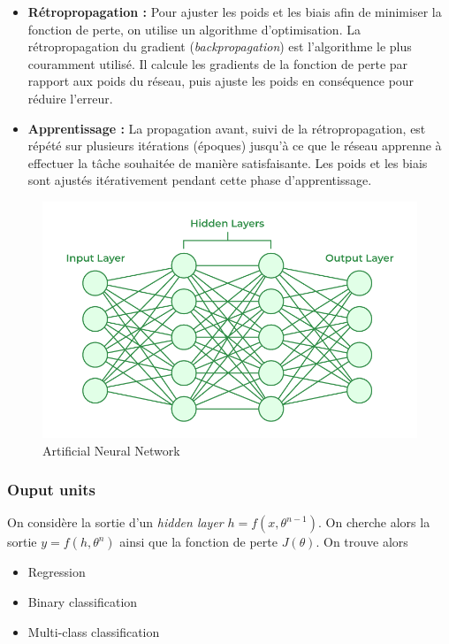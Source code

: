 \documentclass[a4paper]{article}
\begin{document}
\begin{itemize}
    \item \textbf{Rétropropagation :} Pour ajuster les poids et les biais afin de minimiser la fonction de perte, on utilise un algorithme d'optimisation. La rétropropagation du gradient (\textit{backpropagation}) est l'algorithme le plus couramment utilisé. Il calcule les gradients de la fonction de perte par rapport aux poids du réseau, puis ajuste les poids en conséquence pour réduire l'erreur.

    \item \textbf{Apprentissage :} La propagation avant, suivi de la rétropropagation, est répété sur plusieurs itérations (époques) jusqu'à ce que le réseau apprenne à effectuer la tâche souhaitée de manière satisfaisante. Les poids et les biais sont ajustés itérativement pendant cette phase d'apprentissage.
\end{itemize}

\begin{figure}[H]
    \centering
    \includegraphics[scale=0.4]{ann.png}
    \caption{Artificial Neural Network}
    \label{fig:enter-label}
\end{figure}

\subsubsection{Ouput units}

On considère la sortie d'un \textit{hidden layer} $h= f(x, \theta^{n-1})$. On cherche alors la sortie $y= f(h, \theta^{n})$ ainsi que la fonction de perte $J(\theta)$. On trouve alors 
\begin{itemize}
    \item Regression
    \item Binary classification
    \item Multi-class classification
\end{itemize}
\end{document}
